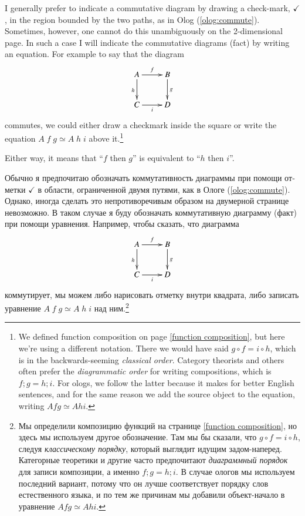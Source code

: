 \documentclass[a4paper]{book}
\theoremstyle{myth}
\begin{document}
\begin{russian}
I generally prefer to indicate a commutative diagram by drawing a check-mark, $\checkmark$, in the region bounded by the two paths, as in Olog (\ref{olog:commute}).  Sometimes, however, one cannot do this unambiguously on the 2-dimensional page.  In such a case I will indicate the commutative diagrams (fact) by writing an equation.  For example to say that the diagram $$\xymatrix{A\ar[r]^f\ar[d]_h&B\ar[d]^g\\C\ar[r]_i&D}$$ commutes, we could either draw a checkmark inside the square or write the equation $A\;f\;g\simeq A\;h\;i$ above it.\footnote{We defined function composition on page \ref{function composition}, but here we're using a different notation. There we would have said $g\circ f = i\circ h$, which is in the backwards-seeming {\em classical order}. Category theorists and others often prefer the {\em diagrammatic order} for writing compositions, which is $f;g = h;i$. For ologs, we follow the latter because it makes for better English sentences, and for the same reason we add the source object to the equation, writing $A f g \simeq A h i$.}

Either way, it means that “$f$ then $g$” is equivalent to “$h$ then $i$”.  

Обычно я предпочитаю обозначать коммутативность диаграммы при помощи отметки $\checkmark$ в области, ограниченной двумя путями, как в Ологе (\ref{olog:commute}).  Однако, иногда сделать это непротиворечивым образом на двумерной странице невозможно.  В таком случае я буду обозначать коммутативную диаграмму (факт) при помощи уравнения.  Например, чтобы сказать, что диаграмма $$\xymatrix{A\ar[r]^f\ar[d]_h&B\ar[d]^g\\C\ar[r]_i&D}$$ коммутирует, мы можем либо нарисовать отметку внутри квадрата, либо записать уравнение $A\;f\;g\simeq A\;h\;i$ над ним.\footnote{Мы определили композицию функций на странице \ref{function composition}, но здесь мы используем другое обозначение. Там мы бы сказали, что $g\circ f = i\circ h$, следуя {\em классическому порядку}, который выглядит идущим задом-наперед. Категорные теоретики и другие часто предпочитают {\em диаграммный порядок} для записи композиции, а именно $f;g = h;i$. В случае ологов мы используем последний вариант, потому что он лучше соответствует порядку слов естественного языка, и по тем же причинам мы добавили объект-начало в уравнение $A f g \simeq A h i$.}
 

\end{russian}
\end{document}
